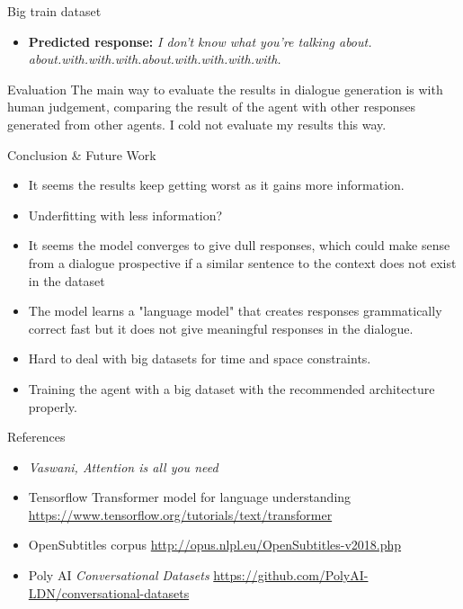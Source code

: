 \documentclass[final]{beamer}
\newlength{\onecolwid}
\begin{document}
\begin{frame}[t]
\begin{columns}[t]
\begin{column}{\onecolwid}
\begin{alertblock}{Big train dataset}
\begin{itemize} 
	\item \textbf{Predicted response:} \textit{I don't know what you're talking about. about.with.with.with.about.with.with.with.with.}
\end{itemize}

\end{alertblock}

\begin{block}{Evaluation}
The main way to evaluate the results in dialogue generation is with human judgement, comparing the result of the agent with other responses generated from other agents. I cold not evaluate my results this way.
\end{block}

\begin{block}{Conclusion \& Future Work}

\begin{itemize} 
	\item It seems the results keep getting worst as it gains more information.
	\item Underfitting with less information?
	\item It seems the model converges to give dull responses, which could make sense from a dialogue prospective if a similar sentence to the context does not exist in the dataset
	\item The model learns a "language model" that creates responses grammatically correct fast but it does not give meaningful responses in the dialogue. 
	\item Hard to deal with big datasets for time and space constraints.
	\item Training the agent with a big dataset with the recommended architecture properly.
\end{itemize}

\end{block}

\begin{block}{References}
\begin{itemize}
\item \textit{Vaswani, Attention is all you need}
\item Tensorflow Transformer model for language understanding \url{https://www.tensorflow.org/tutorials/text/transformer}
\item OpenSubtitles corpus \url{http://opus.nlpl.eu/OpenSubtitles-v2018.php}
\item Poly AI \textit{Conversational Datasets} \url{https://github.com/PolyAI-LDN/conversational-datasets}

\end{itemize}
\end{block}

\end{column} %

\end{columns} %

\end{frame} %
\end{document}
